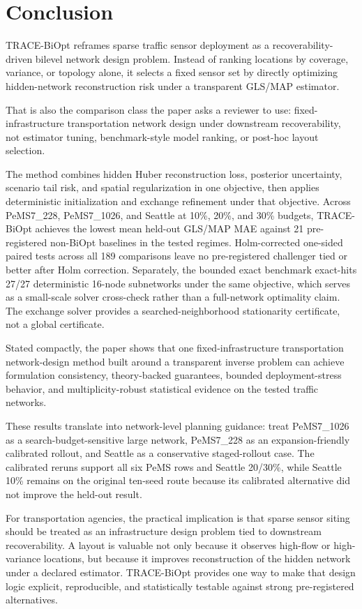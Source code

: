 \section{Conclusion}
\label{sec:conclusion}

TRACE-BiOpt reframes sparse traffic sensor deployment as a recoverability-driven bilevel network design problem. Instead of ranking locations by coverage, variance, or topology alone, it selects a fixed sensor set by directly optimizing hidden-network reconstruction risk under a transparent GLS/MAP estimator.

That is also the comparison class the paper asks a reviewer to use: fixed-infrastructure transportation network design under downstream recoverability, not estimator tuning, benchmark-style model ranking, or post-hoc layout selection.

The method combines hidden Huber reconstruction loss, posterior uncertainty, scenario tail risk, and spatial regularization in one objective, then applies deterministic initialization and exchange refinement under that objective. Across PeMS7\_228, PeMS7\_1026, and Seattle at 10\%, 20\%, and 30\% budgets, TRACE-BiOpt achieves the lowest mean held-out GLS/MAP MAE against 21 pre-registered non-BiOpt baselines in the tested regimes. Holm-corrected one-sided paired tests across all 189 comparisons leave no pre-registered challenger tied or better after Holm correction. Separately, the bounded exact benchmark exact-hits 27/27 deterministic 16-node subnetworks under the same objective, which serves as a small-scale solver cross-check rather than a full-network optimality claim. The exchange solver provides a searched-neighborhood stationarity certificate, not a global certificate.

Stated compactly, the paper shows that one fixed-infrastructure
transportation network-design method built around a transparent inverse
problem can achieve formulation consistency, theory-backed guarantees,
bounded deployment-stress behavior, and multiplicity-robust statistical
evidence on the tested traffic networks.

These results translate into network-level planning guidance: treat PeMS7\_1026 as a search-budget-sensitive large network, PeMS7\_228 as an expansion-friendly calibrated rollout, and Seattle as a conservative staged-rollout case. The calibrated reruns support all six PeMS rows and Seattle 20/30\%, while Seattle 10\% remains on the original ten-seed route because its calibrated alternative did not improve the held-out result.


For transportation agencies, the practical implication is that sparse sensor siting should be treated as an infrastructure design problem tied to downstream recoverability. A layout is valuable not only because it observes high-flow or high-variance locations, but because it improves reconstruction of the hidden network under a declared estimator. TRACE-BiOpt provides one way to make that design logic explicit, reproducible, and statistically testable against strong pre-registered alternatives.
